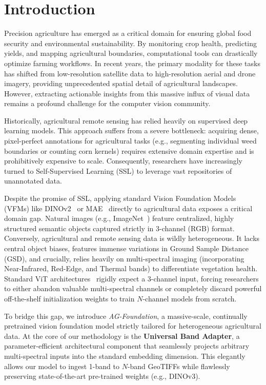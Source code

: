 \section{Introduction}
\label{sec:intro}

Precision agriculture has emerged as a critical domain for ensuring global food security and environmental sustainability. By monitoring crop health, predicting yields, and mapping agricultural boundaries, computational tools can drastically optimize farming workflows. In recent years, the primary modality for these tasks has shifted from low-resolution satellite data to high-resolution aerial and drone imagery, providing unprecedented spatial detail of agricultural landscapes. However, extracting actionable insights from this massive influx of visual data remains a profound challenge for the computer vision community.

Historically, agricultural remote sensing has relied heavily on supervised deep learning models. This approach suffers from a severe bottleneck: acquiring dense, pixel-perfect annotations for agricultural tasks (e.g., segmenting individual weed boundaries or counting corn kernels) requires extensive domain expertise and is prohibitively expensive to scale. Consequently, researchers have increasingly turned to Self-Supervised Learning (SSL) to leverage vast repositories of unannotated data.

Despite the promise of SSL, applying standard Vision Foundation Models (VFMs) like DINOv2~\cite{oquab2023dinov2} or MAE~\cite{he2022masked} directly to agricultural data exposes a critical domain gap. Natural images (e.g., ImageNet~\cite{deng2009imagenet}) feature centralized, highly structured semantic objects captured strictly in 3-channel (RGB) format. Conversely, agricultural and remote sensing data is wildly heterogeneous. It lacks central object biases, features immense variations in Ground Sample Distance (GSD), and crucially, relies heavily on multi-spectral imaging (incorporating Near-Infrared, Red-Edge, and Thermal bands) to differentiate vegetation health. Standard ViT architectures~\cite{dosovitskiy2020image} rigidly expect a 3-channel input, forcing researchers to either abandon valuable multi-spectral channels or completely discard powerful off-the-shelf initialization weights to train $N$-channel models from scratch. 

To bridge this gap, we introduce \textit{AG-Foundation}, a massive-scale, continually pretrained vision foundation model strictly tailored for heterogeneous agricultural data. 
At the core of our methodology is the \textbf{Universal Band Adapter}, a parameter-efficient architectural component that seamlessly projects arbitrary multi-spectral inputs into the standard embedding dimension. This elegantly allows our model to ingest 1-band to $N$-band GeoTIFFs while flawlessly preserving state-of-the-art pre-trained weights (e.g., DINOv3). 

